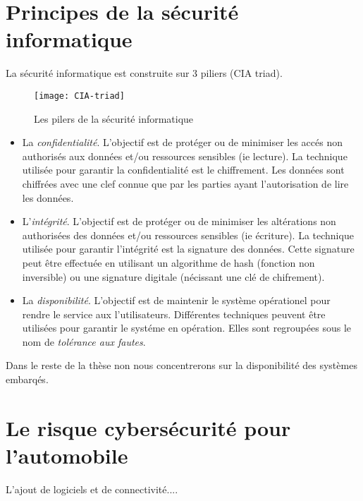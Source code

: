 \section {Principes de la s\'ecurit\'e informatique}
\medskip
{\Huge L}a s\'ecurit\'e informatique est construite sur 3 piliers (CIA triad).

\FloatBarrier
\begin{figure}
	\centering
    \texttt{[image: CIA-triad]}
    \caption{Les pilers de la s\'ecurit\'e informatique}
    \label{fig:CIA}
\end{figure}
\FloatBarrier
  
\begin{itemize}
\item La \emph{confidentialit\'e}. L'objectif est de prot\'eger ou de minimiser les acc\'es non authoris\'es aux donn\'ees et/ou ressources sensibles (ie lecture). La technique utilis\'ee pour garantir la confidentialit\'e est le chiffrement. Les donn\'ees sont chiffr\'ees avec une clef connue que par les parties ayant l'autorisation de lire les donn\'ees. 
\item L'\emph{int\'egrit\'e}. L'objectif est de prot\'eger ou de minimiser les alt\'erations non authoris\'ees des donn\'ees et/ou ressources sensibles (ie \'ecriture). La technique utilis\'ee pour garantir l'int\'egrit\'e est la signature des donn\'ees. Cette signature peut \^etre effectu\'ee en utilisant un algorithme de hash (fonction non inversible) ou une signature digitale (n\'ecissant une cl\'e de chifrement).  
\item La \emph{disponibilit\'e}. L'objectif est de maintenir le syst\`eme op\'erationel pour rendre le service aux l'utilisateurs. Diff\'erentes techniques peuvent \^etre utilis\'ees pour garantir le syst\'eme en op\'eration. Elles sont regroup\'ees sous le nom de \emph{tol\'erance aux fautes}.  
\end{itemize}

Dans le reste de la th\`ese non nous concentrerons sur la disponibilit\'e des syst\`emes embarq\'es. 


\section {Le risque cybers\'ecurit\'e pour l'automobile}
 \medskip
 {\Huge L}'ajout de logiciels et de connectivit\'e....


